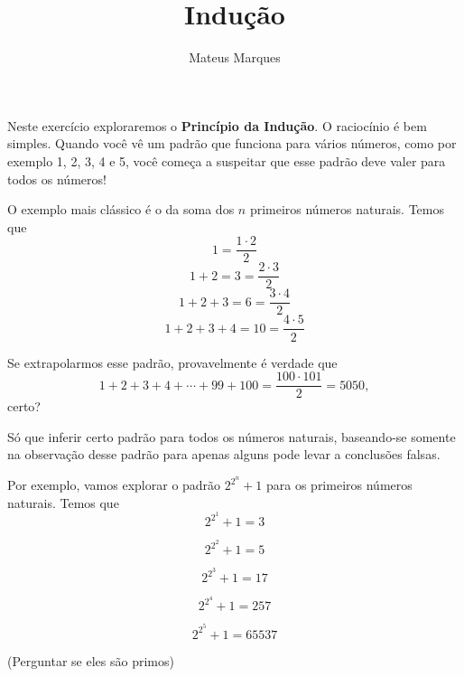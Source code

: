 \documentclass[a4paper,fleqn,12pt]{article}
\title{\Huge{\textbf{Indução}}}
\author{Mateus Marques}
\begin{document}
\maketitle

Neste exercício exploraremos o \textbf{Princípio da Indução}. O raciocínio é bem simples. Quando você vê um padrão que funciona para vários números, como por exemplo 1, 2, 3, 4 e 5, você começa a suspeitar que esse padrão deve valer para todos os números!

O exemplo mais clássico é o da soma dos $n$ primeiros números naturais. Temos que
$$
1 = \frac{1 \cdot 2}{2}
$$
$$
1 + 2 = 3 = \frac{2 \cdot 3}{2}
$$
$$
1 + 2 + 3 = 6 = \frac{3 \cdot 4}{2}
$$
$$
1 + 2 + 3 + 4 = 10 = \frac{4 \cdot 5}{2}
$$

Se extrapolarmos esse padrão, provavelmente é verdade que
$$
1 + 2 + 3 + 4 + \cdots + 99 + 100 = \frac{100 \cdot 101}{2} = 5050,
$$
certo?

Só que inferir certo padrão para todos os números naturais, baseando-se somente na observação desse padrão para apenas alguns pode levar a conclusões falsas.

Por exemplo, vamos explorar o padrão $2^{2^n} + 1$ para os primeiros números naturais. Temos que
$$
2^{2^1} + 1 = 3
$$

$$
2^{2^2} + 1 = 5
$$

$$
2^{2^3} + 1 = 17
$$

$$
2^{2^4} + 1 = 257
$$

$$
2^{2^5} + 1 = 65537
$$

(Perguntar se eles são primos)
\end{document}
